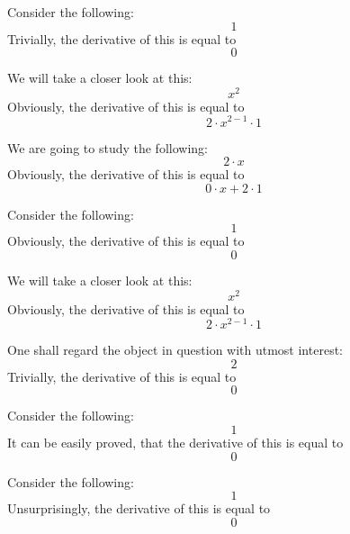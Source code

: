 \documentclass{article}
\begin{document}
Consider the following:
\begin{equation}
1 
\end{equation}
Trivially, the derivative of this is equal to
\begin{equation}
0 
\end{equation}

We will take a closer look at this:
\begin{equation}
x ^{2 } 
\end{equation}
Obviously, the derivative of this is equal to
\begin{equation}
2 \cdot x ^{2 - 1 } \cdot 1 
\end{equation}

We are going to study the following:
\begin{equation}
2 \cdot x 
\end{equation}
Obviously, the derivative of this is equal to
\begin{equation}
0 \cdot x + 2 \cdot 1 
\end{equation}

Consider the following:
\begin{equation}
1 
\end{equation}
Obviously, the derivative of this is equal to
\begin{equation}
0 
\end{equation}

We will take a closer look at this:
\begin{equation}
x ^{2 } 
\end{equation}
Obviously, the derivative of this is equal to
\begin{equation}
2 \cdot x ^{2 - 1 } \cdot 1 
\end{equation}

One shall regard the object in question with utmost interest:
\begin{equation}
2 
\end{equation}
Trivially, the derivative of this is equal to
\begin{equation}
0 
\end{equation}

Consider the following:
\begin{equation}
1 
\end{equation}
It can be easily proved, that the derivative of this is equal to
\begin{equation}
0 
\end{equation}

Consider the following:
\begin{equation}
1 
\end{equation}
Unsurprisingly, the derivative of this is equal to
\begin{equation}
0 
\end{equation}
\end{document}

